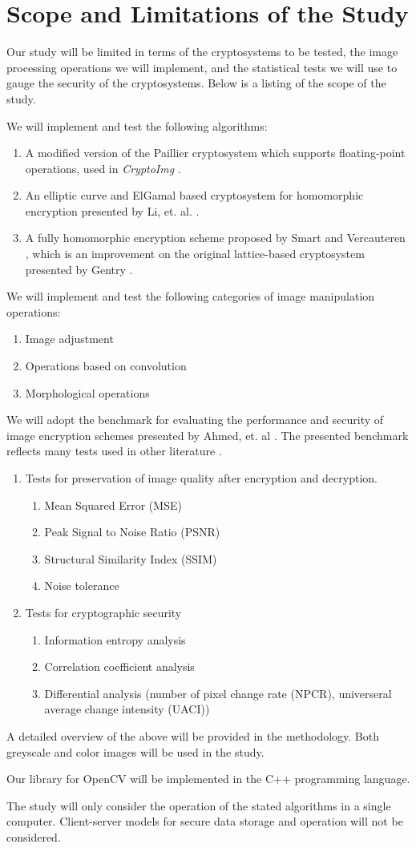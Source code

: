 \section{Scope and Limitations of the Study}
Our study will be limited in terms of the cryptosystems to be tested, the image processing operations we will implement, and the statistical tests we will use to gauge the security of the cryptosystems. Below is a listing of the scope of the study.

We will implement and test the following algorithms:
\begin{enumerate}
	\item A modified version of the Paillier cryptosystem \cite{stern_public-key_1999} which supports floating-point operations, used in \textit{CryptoImg} \cite{ziad_cryptoimg:_2016}.
	\item An elliptic curve and ElGamal based cryptosystem for homomorphic encryption presented by Li, et. al. \cite{li_elliptic_2012}.
	\item A fully homomorphic encryption scheme proposed by Smart and Vercauteren \cite{hutchison_fully_2010}, which is an improvement on the original lattice-based cryptosystem presented by Gentry \cite{gentry_fully_2009}.
\end{enumerate}
We will implement and test the following categories of image manipulation operations:
\begin{enumerate}
	\item Image adjustment
	\item Operations based on convolution
	\item Morphological operations
\end{enumerate}
We will adopt the benchmark for evaluating the performance and security of image encryption schemes presented by Ahmed, et. al \cite{ahmed_benchmark_2016}. The presented benchmark reflects many tests used in other literature \cite{ahmad_efficiency_2012, wu_npcr_2011}.
\begin{enumerate}
	\item Tests for preservation of image quality after encryption and decryption.
	\begin{enumerate}
		\item Mean Squared Error (MSE)
		\item Peak Signal to Noise Ratio (PSNR)
		\item Structural Similarity Index (SSIM)
		\item Noise tolerance
	\end{enumerate}
	\item Tests for cryptographic security
	\begin{enumerate}
		\item Information entropy analysis
		\item Correlation coefficient analysis
		\item Differential analysis (number of pixel change rate (NPCR), universeral average change intensity (UACI))
	\end{enumerate}
\end{enumerate}
A detailed overview of the above will be provided in the methodology.
Both greyscale and color images will be used in the study.

Our library for OpenCV will be implemented in the C++ programming language.

The study will only consider the operation of the stated algorithms in a single computer. Client-server models for secure data storage and operation will not be considered.
